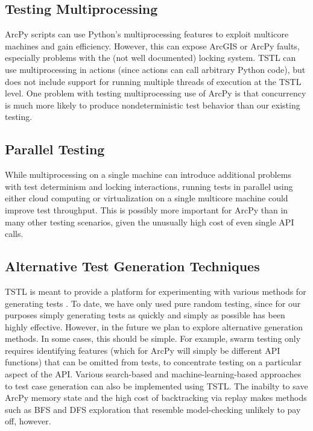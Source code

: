 \subsection{Testing Multiprocessing}

ArcPy scripts can use Python's multiprocessing features to exploit
multicore machines and gain efficiency.  However, this can expose
ArcGIS or ArcPy faults, especially problems with the (not well
documented) locking system.  TSTL can use multiprocessing in actions
(since actions can call arbitrary Python code), but does not include
support for running multiple threads of execution at the TSTL level.
One problem with testing multiprocessing use of ArcPy is that
concurrency is much more likely to produce nondeterministic test
behavior than our existing testing.


\subsection{Parallel Testing}

While multiprocessing on a single machine can introduce additional
problems with test determinism and locking interactions, running tests
in parallel using either cloud computing or virtualization on a
single multicore machine could improve test throughput.   This is
possibly more important for ArcPy than in many other testing
scenarios, given the unusually high cost of even single API calls.

\subsection{Alternative Test Generation Techniques}

TSTL is meant to provide a platform for experimenting with various
methods for generating tests \cite{NFM15}.  To date, we have only used
pure random testing, since for our purposes simply generating tests as
quickly and simply as possible has been highly effective.  However, in
the future we plan to explore alternative generation methods.  In some
cases, this should be simple.  For example, swarm testing
\cite{ISSTA12} only requires identifying features \cite{groce2013help}
(which for ArcPy will simply be different API functions) that can be
omitted from tests, to concentrate testing on a particular aspect of
the API.  Various search-based \cite{FA11} and machine-learning-based
\cite{ISSRE} approaches to test case generation can also be implemented
  using TSTL.  The inabilty to save ArcPy memory state and the high
  cost of backtracking via replay makes methods such as BFS and DFS
  exploration \cite{NFM15} that resemble model-checking
  \cite{ModelChecking,ModelDriven} unlikely to pay off, however.
